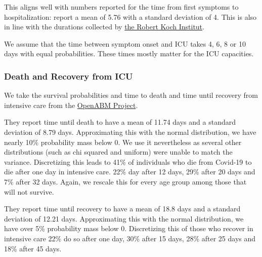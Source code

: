 This aligns well with numbers reported for the time from first symptoms to
hospitalization: \citet{Gaythorpe2020} report a mean of 5.76 with a standard deviation
of 4. This is also in line with the durations collected by
\href{https://www.rki.de/DE/Content/InfAZ/N/Neuartiges_Coronavirus/Steckbrief.html#doc13776792bodyText16}{the
Robert Koch Institut}.

We assume that the time between symptom onset and ICU takes 4, 6, 8 or 10 days with
equal probabilities. These times mostly matter for the ICU capacities.


\subsubsection{Death and Recovery from ICU}

We take the survival probabilities and time to death and time until recovery from
intensive care from the \href{https://tinyurl.com/y5owhyts}{OpenABM Project}.

They report time until death to have a mean of 11.74 days and a standard deviation of
8.79 days. Approximating this with the normal distribution, we have nearly 10\%
probability mass below 0. We use it nevertheless as several other distributions (such as
chi squared and uniform) were unable to match the variance. Discretizing this leads to
41\% of individuals who die from Covid-19 to die after one day in intensive care. 22\%
day after 12 days, 29\% after 20 days and 7\% after 32 days. Again, we rescale this for
every age group among those that will not survive.

They report time until recovery to have a mean of 18.8 days and a standard deviation of
12.21 days. Approximating this with the normal distribution, we have over 5\%
probability mass below 0. Discretizing this of those who recover in intensive care 22\%
do so after one day, 30\% after 15 days, 28\% after 25 days and 18\% after 45 days.
